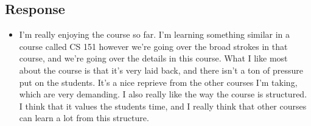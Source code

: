 \documentclass{article}
\begin{document}
\subsection*{Response}
\begin{itemize}
    \item[] I'm really enjoying the course so far. I'm learning something similar in a course called CS 151 however 
    we're going over the broad strokes in that course, and we're going over the details in this course. What I like most about the
    course is that it's very laid back, and there isn't a ton of pressure put on the students. It's a nice reprieve from the other courses
    I'm taking, which are very demanding. I also really like the way the course is structured. I think that it values the students time, and
    I really think that other courses can learn a lot from this structure. 
\end{itemize}
\end{document}
